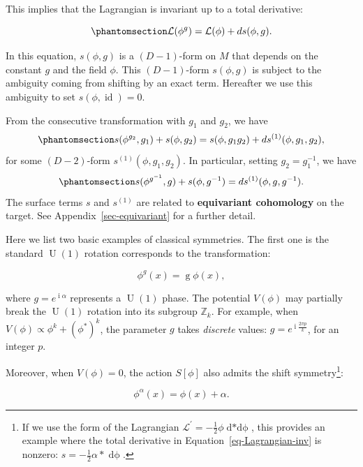 \documentclass[11pt,toc=bibliography]{scrbook}
\DeclareMathOperator{\U}{U}
\DeclareMathOperator{\imunit}{i}
\DeclareMathOperator{\id}{id}
\newcommand{\stdim}{D}
\numberwithin{equation}{section}
\DeclareMathOperator{\U}{U}
\DeclareMathOperator{\imunit}{i}
\DeclareMathOperator{\id}{id}
\newcommand{\stdim}{D}
\begin{document}
This implies that the Lagrangian is invariant up to a total derivative:

\begin{equation}\phantomsection\label{eq-Lagrangian-inv}{
\mathcal{L}(\phi^g) = \mathcal{L}(\phi) + \mathop{ds}(\phi,g).
}\end{equation}

In this equation, \(s(\phi,g)\) is a \((\stdim-1)\)-form on \(M\) that
depends on the constant \(g\) and the field \(\phi\). This
\((D-1)\)-form \(s(\phi,g)\) is subject to the ambiguity coming from
shifting by an exact term. Hereafter we use this ambiguity to set
\(s(\phi,\id)=0\).

From the consecutive transformation with \(g_1\) and \(g_2\), we have
\begin{equation}\phantomsection\label{eq-surface-term-assosiative}{ 
s(\phi^{g_2},g_1) + s(\phi,g_2) = s(\phi,g_1g_2) + ds^{(1)}(\phi,g_1,g_2),
}\end{equation} for some \((D-2)\)-form \(s^{(1)}(\phi,g_1,g_2)\). In
particular, setting \(g_2=g_1^{-1}\), we have
\begin{equation}\phantomsection\label{eq-surface-term-inverse}{s(\phi^{g^{-1}},g) + s(\phi,g^{-1})  = ds^{(1)}(\phi, g, g^{-1}).
}\end{equation} The surface terms \(s\) and \(s^{(1)}\) are related to
\textbf{equivariant cohomology} on the target. See
Appendix~\ref{sec-equivariant} for a further detail.

Here we list two basic examples of classical symmetries. The first one
is the standard \(\U(1)\) rotation corresponds to the transformation:

\[
\phi^g(x) = \mathop{g} \phi(x),
\]

where \(g=e^{\imunit \alpha}\) represents a \(\U(1)\) phase. The
potential \(V(\phi)\) may partially break the \(\U(1)\) rotation into
its subgroup \(\mathbb{Z}_k\). For example, when
\(V(\phi)\propto \phi^k+(\phi^*)^k\), the parameter \(g\) takes
\emph{discrete} values: \(g = e^{\imunit \frac{2\pi p}{k}}\), for an
integer \(p\).

Moreover, when \(V(\phi)=0\), the action \(S[\phi]\) also admits the
shift symmetry\footnote{If we use the form of the Lagrangian
  \(\mathcal{L}^\prime= -\frac12 \phi \mathop{d*d\phi}\), this provides
  an example where the total derivative in
  Equation~\ref{eq-Lagrangian-inv} is nonzero:
  \(s=-\frac12 \alpha \mathop{*}\mathop{d\phi}\).}:

\[
\phi^{\alpha}(x) = \phi(x) + \alpha.
\]
\end{document}
